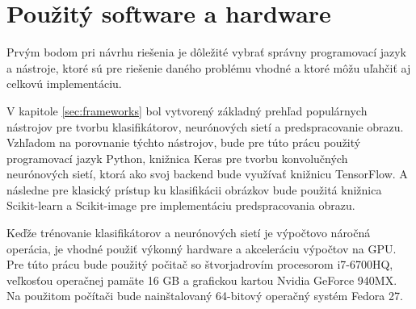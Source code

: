
\section{Použitý software a hardware}
\label{sec:softwarehardware}
Prvým bodom pri návrhu riešenia je dôležité vybrať správny programovací jazyk a nástroje, ktoré sú pre riešenie daného problému vhodné
    a ktoré môžu uľahčiť aj celkovú implementáciu.

V kapitole \ref{sec:frameworks} bol vytvorený základný prehľad populárnych nástrojov pre tvorbu klasifikátorov, neurónových sietí a predspracovanie obrazu.
Vzhľadom na porovnanie týchto nástrojov, bude pre túto prácu použitý programovací jazyk Python, knižnica Keras pre tvorbu konvolučných neurónových sietí, ktorá
    ako svoj backend bude využívať knižnicu TensorFlow.
A následne pre klasický prístup ku klasifikácii obrázkov bude použitá knižnica Scikit-learn a Scikit-image pre implementáciu predspracovania obrazu.

Keďže trénovanie klasifikátorov a neurónových sietí je výpočtovo náročná operácia, je vhodné použiť výkonný hardware a akceleráciu výpočtov na GPU.
Pre túto prácu bude použitý počitač so štvorjadrovím procesorom i7-6700HQ, veľkosťou operačnej pamäte 16 GB a grafickou kartou Nvidia GeForce 940MX.
Na použitom počítači bude nainštalovaný 64-bitový operačný systém Fedora 27.
